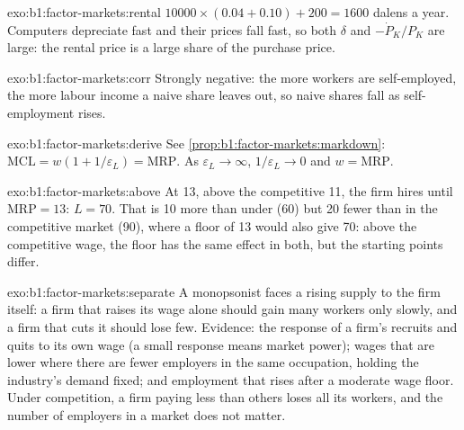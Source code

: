 \begin{solution}{exo:b1:factor-markets:rental}
$10000 \times (0.04 + 0.10) + 200 = 1600$ dalens a year. Computers depreciate fast and
their prices fall fast, so both $\delta$ and $-\dot P_K/P_K$ are large: the rental price is
a large share of the purchase price.
\end{solution}

\begin{solution}{exo:b1:factor-markets:corr}
Strongly negative: the more workers are self-employed, the more labour
income a naive share leaves out, so naive shares fall as self-employment
rises.
\end{solution}

\begin{solution}{exo:b1:factor-markets:derive}
See \cref{prop:b1:factor-markets:markdown}: $\mathrm{MCL} = w(1 + 1/\varepsilon_L) = \mathrm{MRP}$. As $\varepsilon_L \to \infty$,
$1/\varepsilon_L \to 0$ and $w = \mathrm{MRP}$.
\end{solution}

\begin{solution}{exo:b1:factor-markets:above}
At 13, above the competitive 11, the firm hires until $\mathrm{MRP} = 13$: $L = 70$. That
is 10 more than under  (60) but 20 fewer than in the competitive
market (90), where a floor of 13 would also give 70: above the competitive
wage, the floor has the same effect in both, but the starting points
differ.
\end{solution}

\begin{solution}{exo:b1:factor-markets:separate}
A monopsonist faces a rising supply to the firm itself: a firm that raises
its wage alone should gain many workers only slowly, and a firm that cuts
it should lose few. Evidence: the response of a firm's recruits and quits
to its own wage (a small response means market power); wages that are
lower where there are fewer employers in the same occupation, holding the
industry's demand fixed; and employment that rises after a moderate wage
floor. Under competition, a firm paying less than others loses all its
workers, and the number of employers in a market does not matter.
\end{solution}

